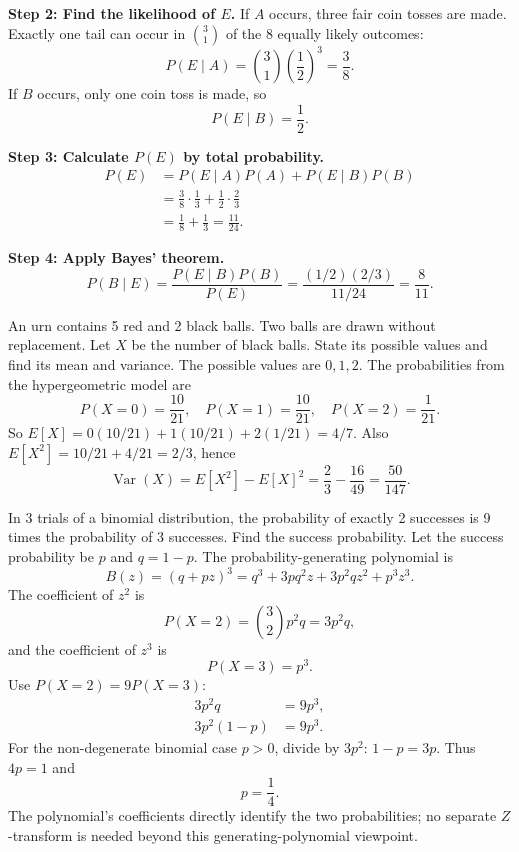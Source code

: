 \begin{enumerate}[label={},leftmargin=0pt,itemsep=9pt]
\textbf{Step 2: Find the likelihood of $E$.} If $A$ occurs, three fair coin tosses are made. Exactly one tail can occur in $\binom31$ of the 8 equally likely outcomes:
\[
P(E\mid A)=\binom31\left(\frac12\right)^3=\frac38.
\]
If $B$ occurs, only one coin toss is made, so
\[
P(E\mid B)=\frac12.
\]

\textbf{Step 3: Calculate $P(E)$ by total probability.}
\begin{align*}
P(E)&=P(E\mid A)P(A)+P(E\mid B)P(B)\\
&=\frac38\cdot\frac13+\frac12\cdot\frac23\\
&=\frac18+\frac13=\frac{11}{24}.
\end{align*}

\textbf{Step 4: Apply Bayes' theorem.}
\[
P(B\mid E)=\frac{P(E\mid B)P(B)}{P(E)}
=\frac{(1/2)(2/3)}{11/24}=\boxed{\frac8{11}}.
\]

 An urn contains 5 red and 2 black balls. Two balls are drawn without replacement. Let $X$ be the number of black balls. State its possible values and find its mean and variance.
\solution The possible values are $0,1,2$. The probabilities from the hypergeometric model are
\[
P(X=0)=\frac{10}{21},\quad P(X=1)=\frac{10}{21},\quad P(X=2)=\frac1{21}.
\]
So $E[X]=0(10/21)+1(10/21)+2(1/21)=\boxed{4/7}$. Also $E[X^2]=10/21+4/21=2/3$, hence
\[
\operatorname{Var}(X)=E[X^2]-E[X]^2=\frac23-\frac{16}{49}=\boxed{\frac{50}{147}}.
\]

 In 3 trials of a binomial distribution, the probability of exactly 2 successes is 9 times the probability of 3 successes. Find the success probability.
\solution Let the success probability be $p$ and $q=1-p$. The probability-generating polynomial is
\[
B(z)=(q+pz)^3=q^3+3pq^2z+3p^2qz^2+p^3z^3.
\]
The coefficient of $z^2$ is
\[
P(X=2)=\binom32p^2q=3p^2q,
\]
and the coefficient of $z^3$ is
\[
P(X=3)=p^3.
\]
Use $P(X=2)=9P(X=3)$:
\begin{align*}
3p^2q&=9p^3,\\
3p^2(1-p)&=9p^3.
\end{align*}
For the non-degenerate binomial case $p>0$, divide by $3p^2$: $1-p=3p$. Thus $4p=1$ and
\[
\boxed{p=\frac14}.
\]
The polynomial's coefficients directly identify the two probabilities; no separate $Z$-transform is needed beyond this generating-polynomial viewpoint.


\end{enumerate}
